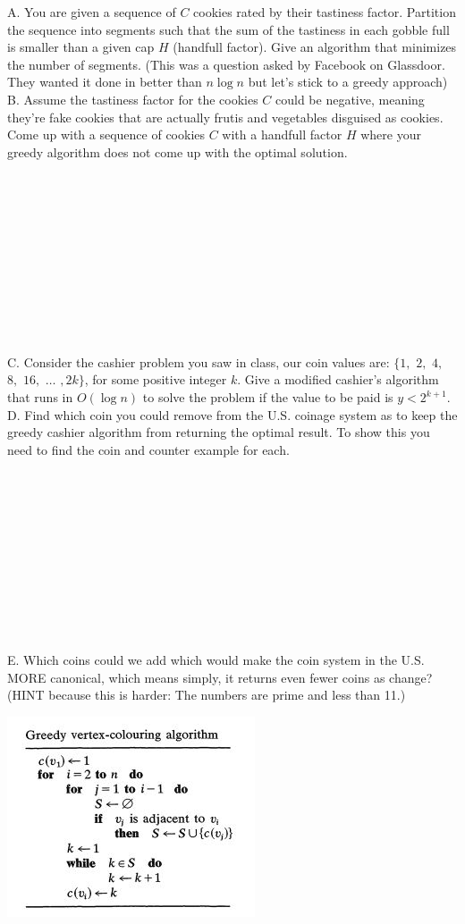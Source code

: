 \documentclass[12pt]{article}
\begin{document}
\noindent A. You are given a sequence of $C$ cookies rated by their tastiness factor. Partition the sequence into segments such that the sum of the tastiness in each gobble full is smaller than a given cap $H$ (handfull factor). Give an algorithm that minimizes the number of segments. (This was a question asked by Facebook on Glassdoor. They wanted it done in better than $n \log{n}$ but let's stick to a greedy approach)
\newpage \noindent B. Assume the tastiness factor for the cookies $C$ could be negative, meaning they're fake cookies that are actually frutis and vegetables disguised as cookies. Come up with a sequence of cookies $C$ with a handfull factor $H$ where your greedy algorithm does not come up with the optimal solution.\\\\\\\\\\\\\\\\\\\\\\\\
C. Consider the cashier problem you saw in class, our coin values are:
$\{1,$ $2,$ $4,$ $8,$ $16,$ $\dots$ $,2k\}$, for some positive integer $k$. Give a modified cashier's algorithm that runs in $O(\log{n})$
to solve the problem if the value to be paid is $y < 2^{k+1}$.
\newpage
\noindent D. Find which coin you could remove from the U.S. coinage system as to keep the greedy cashier algorithm
from returning the optimal result. To show this you need to find the coin and counter example for each.\\\\\\\\\\\\\\\\\\\\\\\\
E. Which coins could we add which would make the coin system in the U.S. MORE canonical, which means simply, it returns even fewer coins as change? (HINT because this is harder:
The numbers are prime and less than 11.)
\newpage 
\noindent \centerline{\includegraphics[scale = 1]{greedycolour.jpg}}
\end{document}
